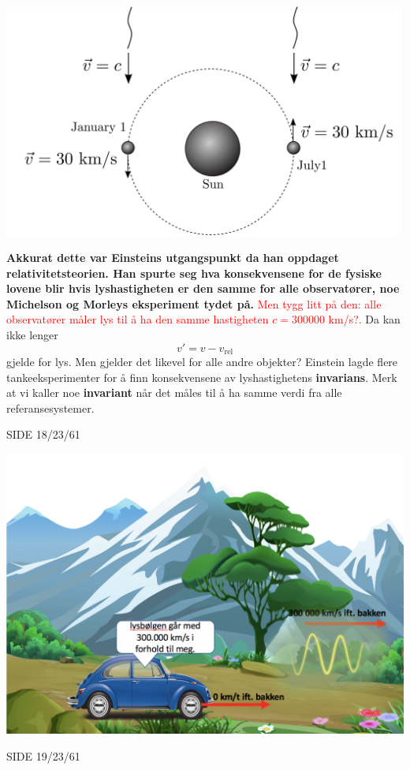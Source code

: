 \documentclass{beamer}
\begin{document}
\begin{frame}
{
  \small
\centerline{\includegraphics[scale=0.55]{media/fig_7-3.png}}
{\bf Akkurat dette var Einsteins utgangspunkt da han oppdaget relativitetsteorien. Han spurte seg hva konsekvensene for de fysiske lovene blir hvis lyshastigheten er den samme for alle observatører, noe Michelson og Morleys eksperiment tydet på.} \textcolor{red}{Men tygg litt på den: alle observatører måler lys til å ha den samme hastigheten $c=300000$ km/s?.} Da kan ikke lenger
\[
v'=v-v_\mathrm{rel}
\]
gjelde for lys. Men gjelder det likevel for alle andre objekter? Einstein lagde flere tankeeksperimenter for å finn konsekvensene av lyshastighetens {\bf invarians}. Merk at vi kaller noe {\bf invariant} når det måles til å ha samme verdi fra alle referansesystemer.
}{SIDE 18/23/61}


{
  \huge
\centerline{\includegraphics[scale=0.3]{media/klassrel8.png}}
}{SIDE 19/23/61}



\end{frame}
\end{document}
